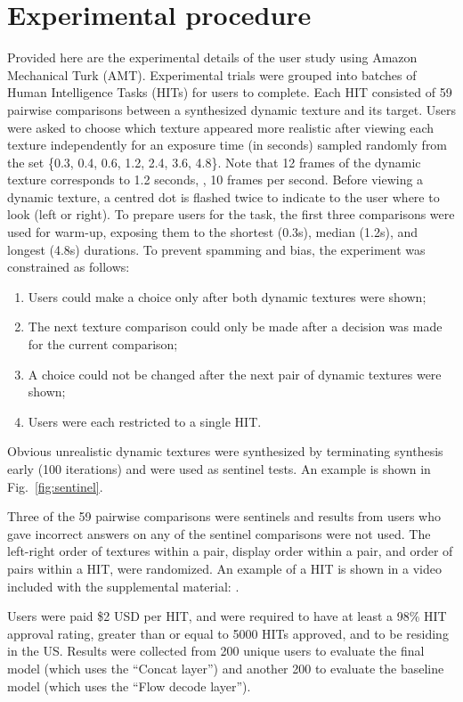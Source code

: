 \section{Experimental procedure}\label{sec:experimental_procedure}
Provided here are the experimental details of the user study
using Amazon Mechanical Turk (AMT). Experimental trials were
grouped into batches of Human Intelligence Tasks (HITs) for
users to complete. Each HIT consisted of 59 pairwise
comparisons between a synthesized dynamic texture and its target.
Users were asked to choose which texture appeared more realistic
after viewing each texture independently for an exposure time (in seconds) 
sampled randomly from the set \{0.3, 0.4, 0.6, 1.2, 2.4, 3.6, 4.8\}.
Note that 12 frames of the dynamic texture corresponds to 1.2 seconds, \ie, 10 frames per second. 
Before viewing a dynamic texture, a centred dot is flashed twice to
indicate to the user where to look (left or right).
To prepare users for the task, the first three comparisons 
were used for warm-up, exposing them to the shortest (0.3s), 
median (1.2s), and longest (4.8s) durations.
To prevent spamming and bias, the experiment was constrained as 
follows:
\begin{enumerate}
	\item Users could make a choice only after both dynamic textures were shown;
	\item The next texture comparison could only be made after a decision was made for the current comparison;
	\item A choice could not be changed after the next pair of dynamic textures were shown;
	\item Users were each restricted to a single HIT.
\end{enumerate}
Obvious unrealistic dynamic textures were synthesized by 
terminating synthesis early (100 iterations) and were used as sentinel tests. An example is shown in Fig.\ \ref{fig:sentinel}.



Three of the 59 pairwise comparisons were sentinels and results from
users who gave incorrect answers on any of the sentinel
comparisons were not used. The left-right order of textures within a pair,
display order within a pair, and order of pairs within a HIT, were randomized.
An example of a HIT is shown in a video included with the supplemental material: .

Users were paid \$2 USD per HIT, and were required to have at least
a 98\% HIT approval rating, greater than or equal to 5000 HITs
approved, and to be residing in the US. Results were collected from 200 unique 
users to evaluate the final model (which uses the ``Concat layer'') and another 200 to evaluate the baseline model (which uses the ``Flow decode layer'').